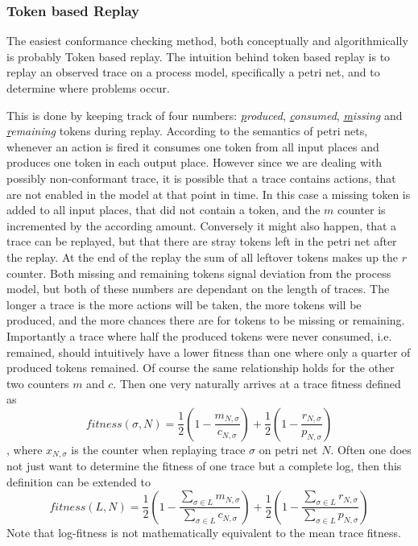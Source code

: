 \documentclass[runningheads]{template/llncs}
\begin{document}
\subsubsection{Token based Replay}

The easiest conformance checking method, both conceptually and algorithmically is probably Token based replay.
The intuition behind token based replay is to replay an observed trace on a process model, specifically a petri net, and to determine where problems occur.

This is done by keeping track of four numbers: \emph{\underline{p}roduced}, \emph{\underline{c}onsumed}, \emph{\underline{m}issing} and \emph{\underline{r}emaining} tokens during replay.
According to the semantics of petri nets, whenever an action is fired it consumes one token from all input places and produces one token in each output place.
However since we are dealing with possibly non-conformant trace, it is possible that a trace contains actions, that are not enabled in the model at that point in time.
In this case a missing token is added to all input places, that did not contain a token, and the $m$ counter is incremented by the according amount.
Conversely it might also happen, that a trace can be replayed, but that there are stray tokens left in the petri net after the replay. 
At the end of the replay the sum of all leftover tokens makes up the $r$ counter.
Both missing and remaining tokens signal deviation from the process model, but both of these numbers are dependant on the length of traces.
The longer a trace is the more actions will be taken, the more tokens will be produced, and the more chances there are for tokens to be missing or remaining.
Importantly a trace where half the produced tokens were never consumed, i.e. remained, should intuitively have a lower fitness than one where only a quarter of produced tokens remained.
Of course the same relationship holds for the other two counters $m$ and $c$.
Then one very naturally arrives at a trace fitness defined as 
\begin{equation}
fitness(σ,N) = \frac{1}{2}(1-\frac{m_{N,σ}}{c_{N,σ}})+\frac{1}{2}(1-\frac{r_{N,σ}}{p_{N,σ}})
\end{equation}
, where $x_{N,σ}$ is the counter when replaying trace $σ$ on petri net $N$.
Often one does not just want to determine the fitness of one trace but a complete log, then this definition can be extended to 
\begin{equation}
	fitness(L,N) = \frac{1}{2}(1-\frac{\sum_{σ\in L}m_{N,σ}}{\sum_{σ\in L}c_{N,σ}})+\frac{1}{2}(1-\frac{\sum_{σ\in L}r_{N,σ}}{\sum_{σ\in L}p_{N,σ}})
\end{equation}
Note that log-fitness is not mathematically equivalent to the mean trace fitness.
\end{document}
